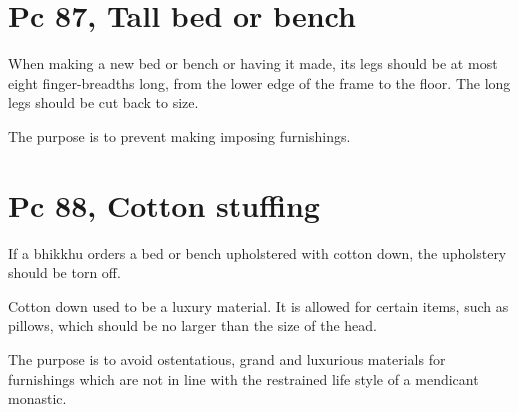 \section{Pc 87, Tall bed or bench}

When making a new bed or bench or having it made, its legs should be at
most eight finger-breadths long, from the lower edge of the frame to the
floor. The long legs should be cut back to size.

The purpose is to prevent making imposing furnishings.

\section{Pc 88, Cotton stuffing}

If a bhikkhu orders a bed or bench upholstered with cotton down, the
upholstery should be torn off.

Cotton down used to be a luxury material. It is allowed for certain
items, such as pillows, which should be no larger than the size of the
head.

The purpose is to avoid ostentatious, grand and luxurious materials for
furnishings which are not in line with the restrained life style of a
mendicant monastic.

